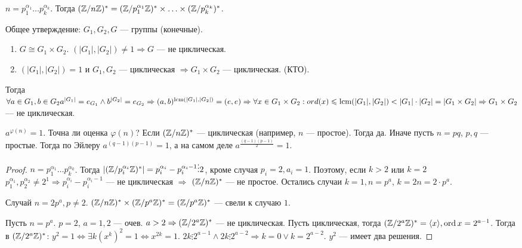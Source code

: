     $n = p_1^{\alpha_1} \ldots p_k^{\alpha_k}$. Тогда $(\mathbb{Z} / n \mathbb{Z})^* = (\mathbb{Z} / p_1^{\alpha_1} \mathbb{Z})^* \times \ldots \times (\mathbb{Z} / p_k ^{\alpha_k})^*$. 

    Общее утверждение:  $G_1, G_2, G$ --- группы (конечные). 
    \begin{enumerate}
        \item $G \cong G_1 \times G_2$. $(|G_1|, |G_2|) \neq 1 \Rightarrow G$ --- не циклическая.
        \item $(|G_1|, |G_2|) = 1$ и $G_1, G_2$ --- циклическая $\Rightarrow G_1 \times G_2$ --- циклическая. (КТО).
    \end{enumerate}

    Тогда $\forall a \in G_1, b \in G_2 a^{|G_1|} = e_{G_1} \land b^{|G_2|} = e_{G_2} \Rightarrow (a, b)^{\operatorname*{lcm}(|G_1|, |G_2|)} = (e, e) \Rightarrow \forall x \in G_1 \times G_2: ord(x) \leqslant \operatorname*{lcm}(|G_1|, |G_2|) < |G_1| \cdot |G_2| = |G_1\times G_2| \Rightarrow G_1 \times G_2$ --- не циклическая.
\begin{remark}
    $a^{\varphi(n)} = 1$. Точна ли оценка  $\varphi(n)$? Если  $(\mathbb{Z} / n\mathbb{Z})^*$ --- циклическая (например, $n$ --- простое). Тогда да. Иначе пусть $n = pq$,  $p,q$ --- простые. Тогда  по Эйлеру $a^{(q-1)(p-1)} = 1$, а на самом деле  $a^{\frac{(q-1)(p-1)}{2}} = 1$. 
\end{remark}
\begin{proof}
    $n = p_1^{\alpha_1} \ldots p_k^{\alpha_k}$. Тогда $|(\mathbb{Z} / p_i^{\alpha_i} \mathbb{Z})^*| = p_i^{\alpha_i} - p_i^{\alpha_i - 1} \vdots 2$, кроме случая  $p_i = 2, a_i = 1$. Поэтому, если  $k > 2$ или  $k = 2$ $p_1^{\alpha_1}, p_2^{\alpha_2} \neq 2^1 \Rightarrow p_i^{\alpha_i} - p_i^{\alpha_i - 1}$ --- не циклическая  $\Rightarrow$  $(\mathbb{Z} / n\mathbb{Z})^*$ --- не простое. Остались случаи  $k=1, n=p^a$,  $k=2 n = 2 \cdot p^a$.

    Случай  $n = 2p^a, p \neq 2$.  $(\mathbb{Z} / n \mathbb{Z})^* \times (\mathbb{Z} / p^a \mathbb{Z})^* = (\mathbb{Z} / p^a \mathbb{Z})^*$ --- свели к случаю  $1$.

    Пусть  $n = p^a$.  $p=2$,  $a = 1,2$ --- очев.  $a>2 \Rightarrow (\mathbb{Z} / 2^a \mathbb{Z})^*$ --- не циклическая. Пусть циклическая, тогда $(\mathbb{Z} / 2^a \mathbb{Z})^* = \langle x \rangle, \operatorname{ord} x = 2^{a-1}$. Тогда  в $(\mathbb{Z} / 2^a \mathbb{Z})^*$:  $y^2 = 1 \iff \exists k (x^k)^2 = 1 \iff x^{2k} = 1$. $2k \vdots 2^{a-1} \land 2k \vdots 2^{a-2} \Rightarrow k = 0 \lor k = 2^{a-2}$. $y^2$ --- имеет два решения.
\end{proof}

